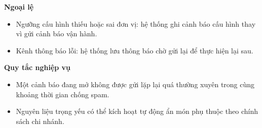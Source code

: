 \documentclass[11pt,a4paper]{article}
\begin{document}
\begin{usecasebox}[title={UC-INV-02 --- Nhận cảnh báo sắp hết hàng}]
    \textbf{Ngoại lệ}
    \begin{itemize}[leftmargin=1.8em]
  \item Ngưỡng cấu hình thiếu hoặc sai đơn vị: hệ thống ghi cảnh báo cấu hình thay vì gửi cảnh báo vận hành.
  \item Kênh thông báo lỗi: hệ thống lưu thông báo chờ gửi lại để thực hiện lại sau.
\end{itemize}

    \textbf{Quy tắc nghiệp vụ}
    \begin{itemize}[leftmargin=1.8em]
  \item Một cảnh báo đang mở không được gửi lặp lại quá thường xuyên trong cùng khoảng thời gian chống spam.
  \item Nguyên liệu trọng yếu có thể kích hoạt tự động ẩn món phụ thuộc theo chính sách chi nhánh.
\end{itemize}
    \end{usecasebox}
\end{document}
